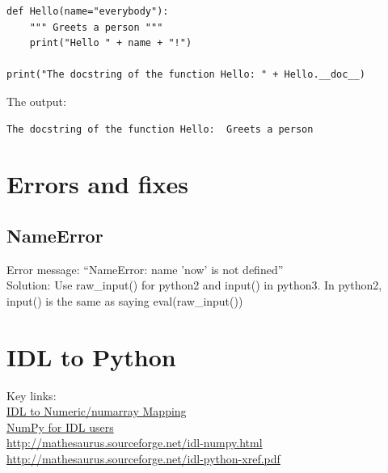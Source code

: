 \documentclass[11pt,a4paper]{article}
\begin{document}
\begin{lstlisting}
def Hello(name="everybody"):
    """ Greets a person """
    print("Hello " + name + "!")

print("The docstring of the function Hello: " + Hello.__doc__)
\end{lstlisting}

\noindent 
The output:
\begin{lstlisting}
The docstring of the function Hello:  Greets a person 
\end{lstlisting}






\newpage
\section{Errors and fixes}
    \subsection{NameError}
    Error message: ``NameError: name 'now' is not defined''\\
    Solution: Use raw\_input() for python2 and input() in python3. In python2, input() is the same as saying eval(raw\_input()) \\ 







\newpage
\section{IDL to Python}
Key links:\\
\href{http://www.johnny-lin.com/cdat_tips/tips_array/idl2num.html}{IDL to Numeric/numarray Mapping}\\
\href{http://www.astro.umd.edu/~mbk/idl-numpy.html}{NumPy for IDL users}\\

\href{http://mathesaurus.sourceforge.net/idl-numpy.html}{http://mathesaurus.sourceforge.net/idl-numpy.html}\\

\href{http://mathesaurus.sourceforge.net/idl-python-xref.pdf}{http://mathesaurus.sourceforge.net/idl-python-xref.pdf}\\
\end{document}
